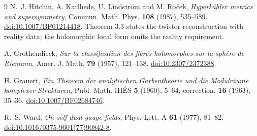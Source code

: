 \begin{thebibliography}{9}
N.~J. Hitchin, A. Karlhede, U. Lindstr\"om and M. Ro\v cek,
\emph{Hyperk\"ahler metrics and supersymmetry},
Commun. Math. Phys. \textbf{108} (1987), 535--589.
\href{https://doi.org/10.1007/BF01214418}{doi:10.1007/BF01214418}.
Theorem 3.3 states the twistor reconstruction with reality data;
the holomorphic local form omits the reality requirement.

A. Grothendieck,
\emph{Sur la classification des fibr\'es holomorphes sur la sph\`ere de Riemann},
Amer. J. Math. \textbf{79} (1957), 121--138.
\href{https://doi.org/10.2307/2372388}{doi:10.2307/2372388}.

H. Grauert,
\emph{Ein Theorem der analytischen Garbentheorie und die Modulr\"aume
komplexer Strukturen}, Publ. Math. IH\'ES \textbf{5} (1960), 5--64;
correction, \textbf{16} (1963), 35--36.
\href{https://doi.org/10.1007/BF02684746}{doi:10.1007/BF02684746}.

R.~S. Ward, \emph{On self-dual gauge fields},
Phys. Lett. A \textbf{61} (1977), 81--82.
\href{https://doi.org/10.1016/0375-9601(77)90842-8}{doi:10.1016/0375-9601(77)90842-8}.
\end{thebibliography}
